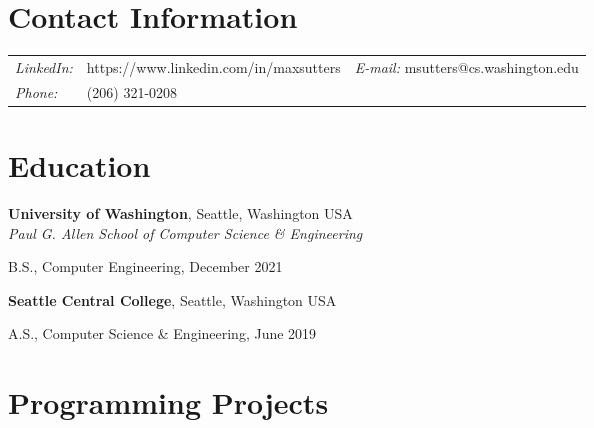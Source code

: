 \documentclass[margin,line]{res}
\newenvironment{list1}{
  \begin{list}{\ding{113}}{%
      \setlength{\itemsep}{0in}
      \setlength{\parsep}{0in} \setlength{\parskip}{0in}
      \setlength{\topsep}{0in} \setlength{\partopsep}{0in} 
      \setlength{\leftmargin}{0.17in}}}{\end{list}}
\begin{document}
\thispagestyle{empty}


\begin{resume}
\section{\sc Contact Information}
\vspace{.05in}
\begin{tabular}{@{}p{0.5in}p{2.5in}p{3in}}
{\it LinkedIn:} & https://www.linkedin.com/in/maxsutters      
							& {\it E-mail:}  msutters@cs.washington.edu \\   
							{\it Phone:}  & (206) 321-0208      \\   
\end{tabular}


\section{\sc Education}
{\bf University of Washington}, Seattle, Washington USA\\
{\em Paul G. Allen School of Computer Science \& Engineering} 
\vspace*{.1cm} 
\begin{list1}
\item[] B.S., Computer Engineering, December 2021
\end{list1}

{\bf Seattle Central College}, Seattle, Washington USA %
\\

\vspace*{-.3cm}
\begin{list1}
\item[] A.S., Computer Science \& Engineering, June 2019
\end{list1}

\section{\sc Programming Projects}


\end{resume}
\end{document}
